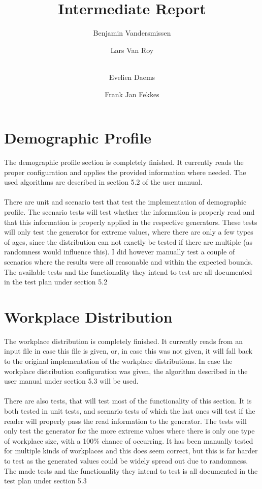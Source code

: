 \documentclass[runningheads]{llncs}
\begin{document}
	\title{Intermediate Report}
	
	\author{Benjamin Vandersmissen \and
		Lars Van Roy \and \\
		Evelien Daems \and
		Frank Jan Fekkes}

	\maketitle              %
	
	\section{Demographic Profile}
	The demographic profile section is completely finished. It currently reads the proper configuration and applies the provided information where needed. The used algorithms are described in section 5.2 of the user manual.\\
	\\
	There are unit and scenario test that test the implementation of demographic profile. The scenario tests will test whether the information is properly read and that this information is properly applied in the respective generators. These tests will only test the generator for extreme values, where there are only a few types of ages, since the distribution can not exactly be tested if there are multiple (as randomness would influence this). I did however manually test a couple of scenarios where the results were all reasonable and within the expected bounds. The available tests and the functionality they intend to test are all documented in the test plan under section 5.2
	
	\section{Workplace Distribution}
	The workplace distribution is completely finished. It currently reads from an input file in case this file is given, or, in case this was not given, it will fall back to the original implementation of the workplace distributions. In case the workplace distribution configuration was given, the algorithm described in the user manual under section 5.3 will be used. \\
	\\
	There are also tests, that will test most of the functionality of this section. It is both tested in unit tests, and scenario tests of which the last ones will test if the reader will properly pass the read information to the generator. The tests will only test the generator for the more extreme values where there is only one type of workplace size, with a 100\% chance of occurring. It has been manually tested for multiple kinds of workplaces and this does seem correct, but this is far harder to test as the generated values could be widely spread out due to randomness. The made tests and the functionality they intend to test is all documented in the test plan under section 5.3
\end{document}
